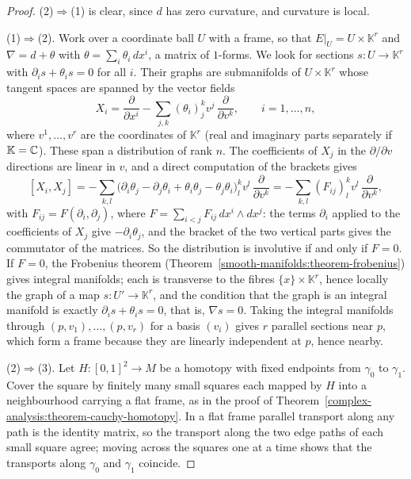 \begin{proof}
(2)$\Rightarrow$(1) is clear, since $d$ has zero curvature, and curvature is local.

(1)$\Rightarrow$(2). Work over a coordinate ball $U$ with a frame, so that $E|_U = U \times \mathbb{K}^r$ and $\nabla = d + \theta$ with $\theta = \sum_i\theta_i\,dx^i$, a matrix of $1$-forms. We look
for sections $s \colon U \to \mathbb{K}^r$ with $\partial_is + \theta_is = 0$ for all $i$. Their graphs are submanifolds of $U \times \mathbb{K}^r$ whose tangent spaces are spanned by the
vector fields
\[
X_i = \frac{\partial}{\partial x^i} - \sum_{j,k}(\theta_i)^k_jv^j\,\frac{\partial}{\partial v^k}, \qquad i = 1, \ldots, n,
\]
where $v^1, \ldots, v^r$ are the coordinates of $\mathbb{K}^r$ (real and imaginary parts separately if $\mathbb{K} = \mathbb{C}$). These span a distribution of rank $n$. The coefficients of
$X_j$ in the $\partial/\partial v$ directions are linear in $v$, and a direct computation of the brackets gives
\[
[X_i, X_j] = -\sum_{k,l}\bigl(\partial_i\theta_j - \partial_j\theta_i + \theta_i\theta_j - \theta_j\theta_i\bigr)^k_lv^l\,\frac{\partial}{\partial v^k} = -\sum_{k,l}(F_{ij})^k_lv^l\,\frac{\partial}{\partial v^k},
\]
with $F_{ij} = F(\partial_i, \partial_j)$, where $F = \sum_{i<j}F_{ij}\,dx^i \wedge dx^j$: the terms $\partial_i$ applied to the coefficients of $X_j$ give $-\partial_i\theta_j$, and the
bracket of the two vertical parts gives the commutator of the matrices. So the distribution is involutive if and only if $F = 0$. If $F = 0$, the Frobenius theorem
(Theorem~\ref{smooth-manifolds:theorem-frobenius}) gives integral manifolds; each is transverse to the fibres $\{x\} \times \mathbb{K}^r$, hence locally the graph of a map $s \colon U' \to \mathbb{K}^r$, and the condition
that the graph is an integral manifold is exactly $\partial_is + \theta_is = 0$, that is, $\nabla s = 0$. Taking the integral manifolds through $(p, v_1), \ldots, (p, v_r)$ for a basis $(v_i)$ gives $r$ parallel
sections near $p$, which form a frame because they are linearly independent at $p$, hence nearby.

(2)$\Rightarrow$(3). Let $H \colon [0,1]^2 \to M$ be a homotopy with fixed endpoints from $\gamma_0$ to $\gamma_1$. Cover the square by finitely many small squares each mapped by $H$ into a neighbourhood
carrying a flat frame, as in the proof of Theorem~\ref{complex-analysis:theorem-cauchy-homotopy}. In a flat frame parallel transport along any path is the identity matrix, so the transport along the two
edge paths of each small square agree; moving across the squares one at a time shows that the transports along $\gamma_0$ and $\gamma_1$ coincide.


\end{proof}
